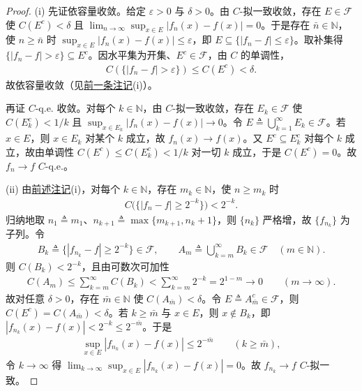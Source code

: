 \documentclass[../../main.tex]{subfiles}%
\begin{document}
\begin{proof}
(i) 先证依容量收敛。给定 $\varepsilon>0$ 与 $\delta>0$。由 $C$-拟一致收敛，存在 $E\in\mathscr F$ 使 $C(E^c)<\delta$ 且 $\lim_{n\to\infty}\sup_{x\in E}|f_n(x)-f(x)|=0$。于是存在 $\bar n\in\mathbb{N}$，使 $n\geqslant\bar n$ 时 $\sup_{x\in E}|f_n(x)-f(x)|\leqslant\varepsilon$，即 $E\subseteq\{|f_n-f|\leqslant\varepsilon\}$。取补集得 $\{|f_n-f|>\varepsilon\}\subseteq E^c$。因水平集为开集、$E^c\in\mathscr F$，由 $C$ 的单调性，
\begin{align*}
C(\{|f_n-f|>\varepsilon\})\leqslant C(E^c)<\delta.
\end{align*}
故依容量收敛（见\hyperref[remark:ch02-依容量判据]{前一条注记}(i)）。

再证 $C$-q.e. 收敛。对每个 $k\in\mathbb{N}$，由 $C$-拟一致收敛，存在 $E_k\in\mathscr F$ 使 $C(E_k^c)<1/k$ 且 $\sup_{x\in E_k}|f_n(x)-f(x)|\to0$。令 $E\triangleq\bigcup_{k=1}^\infty E_k\in\mathscr F$。若 $x\in E$，则 $x\in E_k$ 对某个 $k$ 成立，故 $f_n(x)\to f(x)$。又 $E^c\subseteq E_k^c$ 对每个 $k$ 成立，故由单调性 $C(E^c)\leqslant C(E_k^c)<1/k$ 对一切 $k$ 成立，于是 $C(E^c)=0$。故 $f_n\to f$ $C$-q.e.。

(ii) 由\hyperref[remark:ch02-依容量判据]{前述注记}(i)，对每个 $k\in\mathbb{N}$，存在 $m_k\in\mathbb{N}$，使 $n\geqslant m_k$ 时
\begin{align*}
C\bigl(\{|f_n-f|\geqslant2^{-k}\}\bigr)<2^{-k}.
\end{align*}
归纳地取 $n_1\triangleq m_1$、$n_{k+1}\triangleq\max\{m_{k+1},n_k+1\}$，则 $\{n_k\}$ 严格增，故 $\{f_{n_k}\}$ 为子列。令
\begin{align*}
B_k\triangleq\{|f_{n_k}-f|\geqslant2^{-k}\}\in\mathscr F,\qquad
A_m\triangleq\bigcup_{k=m}^\infty B_k\in\mathscr F\quad(m\in\mathbb{N}).
\end{align*}
则 $C(B_k)<2^{-k}$，且由可数次可加性
\begin{align*}
C(A_m)\leqslant\sum_{k=m}^\infty C(B_k)<\sum_{k=m}^\infty2^{-k}=2^{1-m}\to0\qquad(m\to\infty).
\end{align*}
故对任意 $\delta>0$，存在 $\bar m\in\mathbb{N}$ 使 $C(A_{\bar m})<\delta$。令 $E\triangleq A_{\bar m}^c\in\mathscr F$，则 $C(E^c)=C(A_{\bar m})<\delta$。若 $k\geqslant\bar m$ 与 $x\in E$，则 $x\notin B_k$，即 $|f_{n_k}(x)-f(x)|<2^{-k}\leqslant2^{-\bar m}$。于是
\begin{align*}
\sup_{x\in E}|f_{n_k}(x)-f(x)|\leqslant2^{-\bar m}\qquad(k\geqslant\bar m),
\end{align*}
令 $k\to\infty$ 得 $\lim_{k\to\infty}\sup_{x\in E}|f_{n_k}(x)-f(x)|=0$。故 $f_{n_k}\to f$ $C$-拟一致。
\end{proof}
\end{document}
